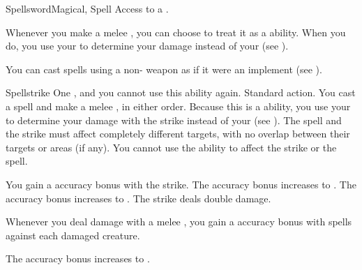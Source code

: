   \begin{magicalfeat}{Spellsword}{Magical, Spell}
    \featpre Access to a .

     Whenever you make a melee , you can choose to treat it as a \magical ability.
    When you do, you use your  to determine your damage instead of your  (see ).

     You can cast spells using a non- weapon as if it were an implement (see ).

    \begin{magicalactiveability}{Spellstrike}
      \abilitycost One , and you  cannot use this ability again.
      \abilityusagetime Standard action.
      \rankline
      You cast a spell and make a melee , in either order.
      Because this is a \magical ability, you use your  to determine your damage with the strike instead of your  (see ).
      The spell and the strike must affect completely different targets, with no overlap between their targets or areas (if any).
      You cannot use the  ability to affect the strike or the spell.

      \rankline
       You gain a  accuracy bonus with the strike.
       The accuracy bonus increases to .
       The accuracy bonus increases to .
       The strike deals double damage.
    \end{magicalactiveability}

     Whenever you deal damage with a melee , you  gain a  accuracy bonus with spells against each damaged creature.

     The accuracy bonus increases to .
  \end{magicalfeat}

